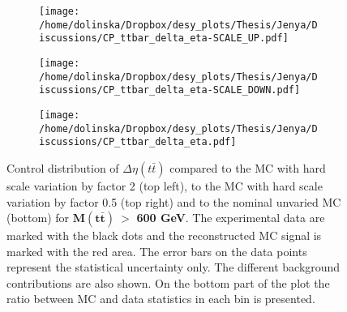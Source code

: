 \begin{figure}[t]
\centering
\begin{subfigure}
  \centering
  \texttt{[image: /home/dolinska/Dropbox/desy\_plots/Thesis/Jenya/Discussions/CP\_ttbar\_delta\_eta-SCALE\_UP.pdf]}
\end{subfigure}
\begin{subfigure}
  \centering
  \texttt{[image: /home/dolinska/Dropbox/desy\_plots/Thesis/Jenya/Discussions/CP\_ttbar\_delta\_eta-SCALE\_DOWN.pdf]}
\end{subfigure}
\begin{subfigure}
  \centering
  \texttt{[image: /home/dolinska/Dropbox/desy\_plots/Thesis/Jenya/Discussions/CP\_ttbar\_delta\_eta.pdf]}
\end{subfigure}
\caption{Control distribution of $\Delta\eta({t\bar{t}})$ compared to the MC with hard scale variation by factor 2 (top left), to the MC with hard scale variation 
         by factor 0.5 (top right) and to the nominal unvaried MC (bottom) for $\mathbf{M(t\bar{t})\: >}$ \textbf{600 GeV}. The experimental data are marked with the black 
         dots and the reconstructed MC signal is marked with the red area. The error
         bars on the data points represent the statistical uncertainty only. The 
         different background contributions are also shown. On the bottom part of the plot the ratio between MC and data statistics in each bin
         is presented.}
\label{fig:CP_eta_hard}
\end{figure}
% 
% 
% 

